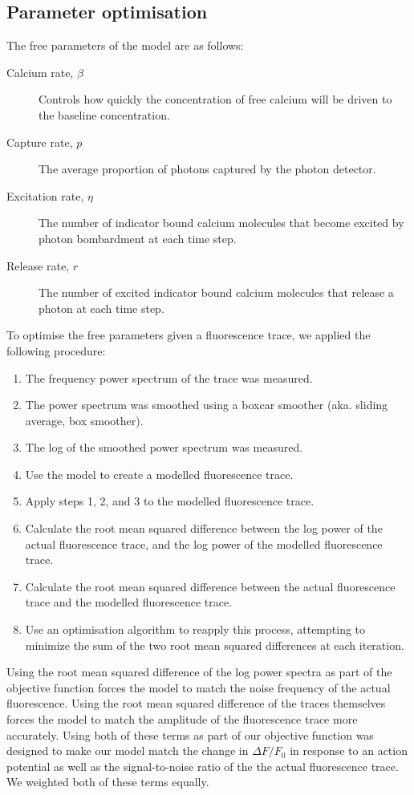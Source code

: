 \subsection{Parameter optimisation}\label{sec:parameter_optimisation}
The free parameters of the model are as follows:
\begin{description}
    \item[Calcium rate, $\beta$] Controls how quickly the concentration of free calcium will be driven to the baseline concentration.
    \item[Capture rate, $p$] The average proportion of photons captured by the photon detector.
    \item[Excitation rate, $\eta$] The number of indicator bound calcium molecules that become excited by photon bombardment at each time step.
    \item[Release rate, $r$] The number of excited indicator bound calcium molecules that release a photon at each time step.
\end{description}
To optimise the free parameters given a fluorescence trace, we applied the following procedure:
\begin{enumerate}
    \item The frequency power spectrum of the trace was measured.
    \item The power spectrum was smoothed using a boxcar smoother (aka. sliding average, box smoother).
    \item The log of the smoothed power spectrum was measured.
    \item Use the model to create a modelled fluorescence trace.
    \item Apply steps 1, 2, and 3 to the modelled fluorescence trace.
    \item Calculate the root mean squared difference between the log power of the actual fluorescence trace, and the log power of the modelled fluorescence trace.
    \item Calculate the root mean squared difference between the actual fluorescence trace and the modelled fluorescence trace.
    \item Use an optimisation algorithm to reapply this process, attempting to minimize the sum of the two root mean squared differences at each iteration.
\end{enumerate}
Using the root mean squared difference of the log power spectra as part of the objective function forces the model to match the noise frequency of the actual fluorescence. Using the root mean squared difference of the traces themselves forces the model to match the amplitude of the fluorescence trace more accurately. Using both of these terms as part of our objective function was designed to make our model match the change in $\Delta F/F_0$ in response to an action potential as well as the signal-to-noise ratio of the the actual fluorescence trace. We weighted both of these terms equally.

